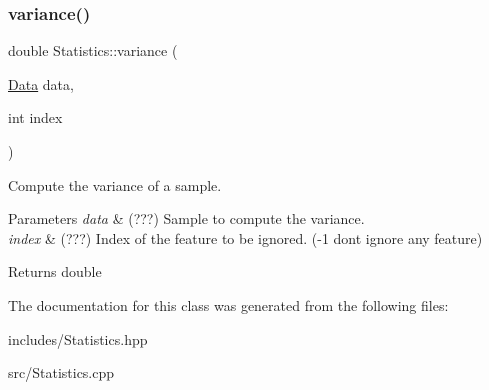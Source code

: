\subsubsection{\texorpdfstring{variance()}{variance()}\hspace{0.1cm}{\footnotesize\ttfamily [2/2]}}
{\footnotesize\ttfamily double Statistics\+::variance (\begin{DoxyParamCaption}\item[{\hyperlink{class_data}{Data}}]{data,  }\item[{int}]{index }\end{DoxyParamCaption})\hspace{0.3cm}{\ttfamily [static]}}



Compute the variance of a sample. 


\begin{DoxyParams}{Parameters}
{\em data} & (???) Sample to compute the variance. \\
\hline
{\em index} & (???) Index of the feature to be ignored. (-\/1 dont ignore any feature) \\
\hline
\end{DoxyParams}
\begin{DoxyReturn}{Returns}
double 
\end{DoxyReturn}


The documentation for this class was generated from the following files\+:\begin{DoxyCompactItemize}
\item 
includes/Statistics.\+hpp\item 
src/Statistics.\+cpp\end{DoxyCompactItemize}
